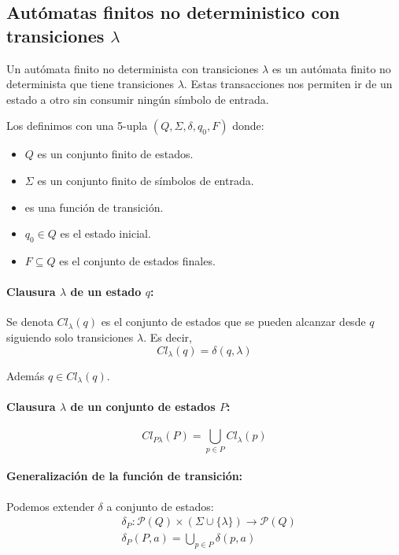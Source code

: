 \subsection{Autómatas finitos no deterministico con transiciones  \texorpdfstring{\(\lambda\)}{lambda}}
\label{sec:afd-lambda}
Un autómata finito no determinista con transiciones \(\lambda\) es un autómata finito no determinista que tiene transiciones \(\lambda\). Estas transacciones nos permiten ir de un estado a otro sin consumir ningún símbolo de entrada.

Los definimos con una 5-upla \((Q,\Sigma,\delta,q_0,F)\) donde:
\begin{itemize}
  \item \(Q\) es un conjunto finito de estados.
  \item \(\Sigma\) es un conjunto finito de símbolos de entrada.
  \item {} es una función de transición.
  \item \(q_0 \in Q\) es el estado inicial.
  \item \(F \subseteq Q\) es el conjunto de estados finales.
\end{itemize}

\paragraph{Clausura \(\lambda\) de un estado \(q\):} Se denota \(Cl_\lambda(q)\) es el conjunto de estados que se pueden alcanzar desde \(q\) siguiendo solo transiciones \(\lambda\). Es decir, \[Cl_\lambda(q) = \delta(q,\lambda)\]

Además \(q\in Cl_\lambda(q)\).

\paragraph{Clausura \(\lambda\) de un conjunto de estados \(P\):} \[Cl_{P\lambda}(P) = \bigcup_{p\in P} Cl_\lambda(p)\]
\paragraph{Generalización de la función de transición:}
Podemos extender \(\delta\) a conjunto de estados:
\begin{align*}
   & \delta_P: \mathcal{P}(Q) \times (\Sigma \cup \{\lambda\}) \to \mathcal{P}(Q) \\
   & \delta_P(P,a) = \underset{p\in P}{\bigcup} \delta(p,a)
\end{align*}

